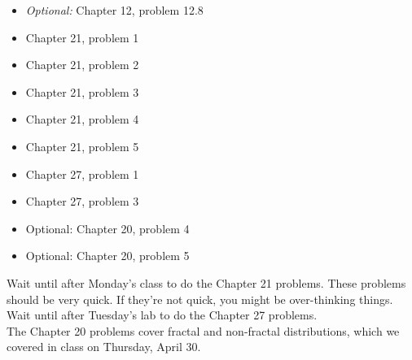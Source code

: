\documentclass[12pt]{extarticle}
\begin{document}
\begin{itemize}
  \setlength{\itemsep}{-1mm}
  \item \textit{Optional:} Chapter 12, problem 12.8
  \item Chapter 21, problem 1
  \item Chapter 21, problem 2
  \item Chapter 21, problem 3
  \item Chapter 21, problem 4
  \item Chapter 21, problem 5
  \item Chapter 27, problem 1
  \item Chapter 27, problem 3
  \item Optional: Chapter 20, problem 4
  \item Optional: Chapter 20, problem 5
\end{itemize}

Wait until after Monday's class to do the Chapter 21 problems. These
problems should be very quick. If they're not quick, you might be
over-thinking things. \\

Wait until after Tuesday's lab to do the Chapter 27 problems. \\

The Chapter 20 problems cover fractal and non-fractal distributions, 
which we covered in class on Thursday, April 30. \\


\end{document}
